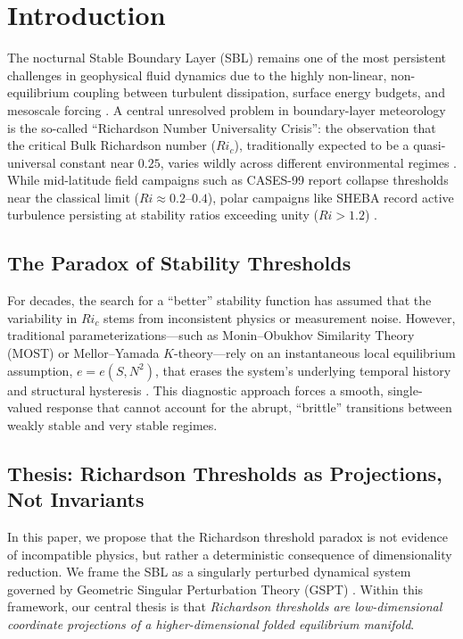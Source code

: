 \section{Introduction}

The nocturnal Stable Boundary Layer (SBL) remains one of the most persistent challenges in geophysical fluid dynamics due to the highly non-linear, non-equilibrium coupling between turbulent dissipation, surface energy budgets, and mesoscale forcing \citep{nieuwstadt1984, mahrt2014, vanDeWiel2017}. A central unresolved problem in boundary-layer meteorology is the so-called ``Richardson Number Universality Crisis'': the observation that the critical Bulk Richardson number ($Ri_c$), traditionally expected to be a quasi-universal constant near $0.25$, varies wildly across different environmental regimes \citep{Grachev2013, Monahan2015}. While mid-latitude field campaigns such as CASES-99 report collapse thresholds near the classical limit ($Ri \approx 0.2\text{--}0.4$), polar campaigns like SHEBA record active turbulence persisting at stability ratios exceeding unity ($Ri > 1.2$) \citep{poulos2002cases99, Grachev2005}.

\subsection{The Paradox of Stability Thresholds}

For decades, the search for a ``better'' stability function has assumed that the variability in $Ri_c$ stems from inconsistent physics or measurement noise. However, traditional parameterizations---such as Monin--Obukhov Similarity Theory (MOST) or Mellor--Yamada $K$-theory---rely on an instantaneous local equilibrium assumption, $e = e(S, N^2)$, that erases the system's underlying temporal history and structural hysteresis \citep{MellorYamada1982}. This diagnostic approach forces a smooth, single-valued response that cannot account for the abrupt, ``brittle'' transitions between weakly stable and very stable regimes.

\subsection{Thesis: Richardson Thresholds as Projections, Not Invariants}

In this paper, we propose that the Richardson threshold paradox is not evidence of incompatible physics, but rather a deterministic consequence of dimensionality reduction. We frame the SBL as a singularly perturbed dynamical system governed by Geometric Singular Perturbation Theory (GSPT) \citep{Fenichel1979, Kuehn2015}. Within this framework, our central thesis is that \emph{Richardson thresholds are low-dimensional coordinate projections of a higher-dimensional folded equilibrium manifold}.

